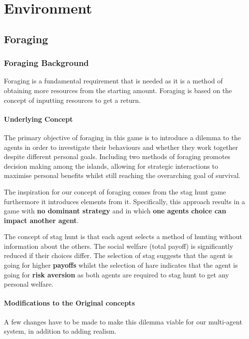\chapter{Environment}
\section{Foraging}
\subsection{Foraging Background}

Foraging is a fundamental requirement that is needed as it is a method of obtaining more resources from the starting amount. Foraging is based on the concept of inputting resources to get a return.

\subsubsection{Underlying Concept}

The primary objective of foraging in this game is to introduce a dilemma to the agents in order to investigate their behaviours and whether they work together despite different personal goals. Including two methods of foraging promotes decision making among the islands, allowing for strategic interactions to maximise personal benefits whilst still reaching the overarching goal of survival. 

The inspiration for our concept of foraging comes from the stag hunt game furthermore it introduces elements from it. Specifically, this approach results in a game with \textbf{no dominant strategy} and in which \textbf{one agents choice can impact another agent}.

The concept of stag hunt is that each agent selects a method of hunting without information about the others. The social welfare (total payoff) is significantly reduced if their choices differ. The selection of stag suggests that the agent is going for higher \textbf{payoffs} whilst the selection of hare indicates that the agent is going for \textbf{risk aversion} as both agents are required to stag hunt to get any personal welfare.

\subsubsection{Modifications to the Original concepts} 
A few changes have to be made to make this dilemma viable for our multi-agent system, in addition to adding realism. 

